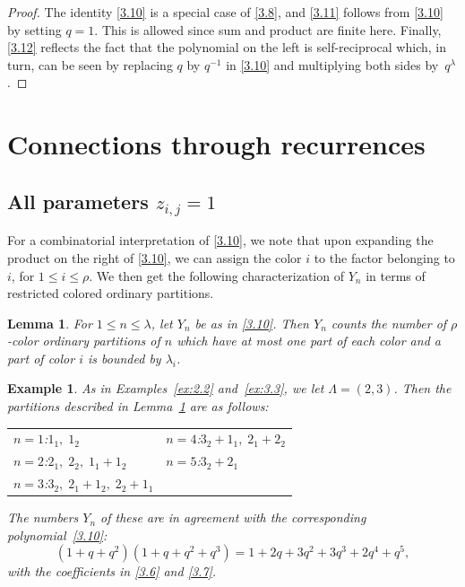 \documentclass{amsart}
\theoremstyle{plain}
\newtheorem{example}[theorem]{Example}
\newtheorem{lemma}[theorem]{Lemma}
\numberwithin{equation}{section}
\begin{document}
\begin{proof}
The identity \eqref{3.10} is a special case of \eqref{3.8}, and \eqref{3.11}
follows from \eqref{3.10} by setting $q=1$. This is allowed since sum and 
product are finite here. Finally, \eqref{3.12} reflects the fact that the
polynomial on the left is self-reciprocal which, in turn, can be seen by
replacing $q$ by $q^{-1}$ in \eqref{3.10} and multiplying both sides 
by~$q^\lambda$.
\end{proof}

\section{Connections through recurrences}\label{sec:4}

\subsection{All parameters $z_{i,j}=1$}\label{sec:4.1}

For a combinatorial interpretation of \eqref{3.10}, we note that upon 
expanding the product on the right of \eqref{3.10}, we can assign the 
color $i$ to the factor
belonging to $i$, for $1\leq i\leq\rho$. We then get the following 
characterization of $Y_n$ in terms of restricted colored ordinary partitions.

\begin{lemma}\label{lem:3.6}
For $1\leq n\leq\lambda$, let $Y_n$ be as in \eqref{3.10}. Then $Y_n$ counts 
the number of $\rho$-color ordinary partitions of $n$ which have at most
one part of each color and a part of color $i$ is bounded by $\lambda_i$.
\end{lemma} 

\begin{example}\label{ex:3.7}
{\rm As in Examples~\ref{ex:2.2} and~\ref{ex:3.3}, we let $\Lambda=(2,3)$. Then
the partitions described in Lemma~\ref{lem:3.6} are as follows:}
\begin{center}
\begin{tabular}{l|l}
$n=1$:\quad $1_1,\;1_2$ & $n=4$:\quad $3_2+1_1,\;2_1+2_2$ \\
$n=2$:\quad $2_1,\;2_2,\;1_1+1_2$ & $n=5$:\quad $3_2+2_1$ \\
$n=3$:\quad $3_2,\;2_1+1_2,\;2_2+1_1$ &
\end{tabular}
\end{center}
{\rm The numbers $Y_n$ of these are in agreement with the corresponding
polynomial~\eqref{3.10}:
\[
\left(1+q+q^2\right)\left(1+q+q^2+q^3\right)
= 1+2q+3q^2+3q^3+2q^4+q^5,
\]
with the coefficients in \eqref{3.6} and \eqref{3.7}.}
\end{example}
\end{document}

